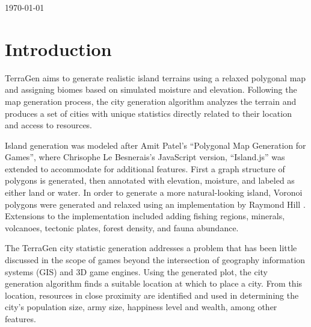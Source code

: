 \begin{titlepage}

{\large \today}\\[3cm] %




\vfill %

\end{titlepage}

\section{Introduction}

TerraGen aims to generate realistic island terrains using a relaxed polygonal map and assigning biomes based on simulated moisture and elevation. Following the map generation process, the city generation algorithm analyzes the terrain and produces a  set of cities with unique statistics directly related to their location and access to resources.

Island generation was modeled after Amit Patel's ``Polygonal Map Generation for Games''\cite{Patel:2010:Online}, where Chrisophe Le Besnerais's JavaScript version, ``Island.js''\cite{LeBesnec:2015:Online} was extended to accommodate for additional features. First a graph structure of polygons is generated, then annotated with elevation, moisture, and labeled as either land or water. In order to generate a more natural-looking island, Voronoi polygons were generated and relaxed using an implementation by Raymond Hill \cite{Hill:2015:Online}. Extensions to the implementation included adding fishing regions, minerals, volcanoes, tectonic plates, forest density, and fauna abundance.

The TerraGen city statistic generation addresses a problem that has been little discussed in the scope of games beyond the intersection of geography information systems (GIS) and 3D game engines. Using the generated plot, the city generation algorithm finds a suitable location at which to place a city. From this location, resources in close proximity are identified and used in determining the city's population size, army size, happiness level and wealth, among other features.

